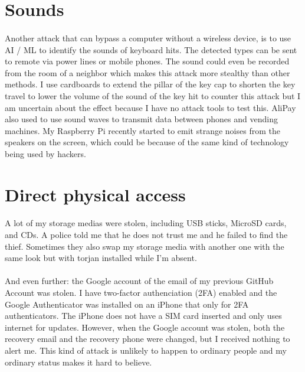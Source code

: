 \documentclass[mscthesis]{usiinfthesis}
\begin{document}
\section{Sounds}
\paragraph{}
Another attack that can bypass a computer without a wireless device, is to use AI / ML to identify the sounds of keyboard hits. The detected types can be sent to remote via power lines or mobile phones. The sound could even be recorded from the room of a neighbor which makes this attack more stealthy than other methods. I use cardboards to extend the pillar of the key cap to shorten the key travel to lower the volume of the sound of the key hit to counter this attack but I am uncertain about the effect because I have no attack tools to test this. AliPay also used to use sound waves to transmit data between phones and vending machines. My Raspberry Pi recently started to emit strange noises from the speakers on the screen, which could be because of the same kind of technology being used by hackers.

\section{Direct physical access}
\paragraph{}
A lot of my storage medias were stolen, including USB sticks, MicroSD cards, and CDs. A police told me that he does not trust me and he failed to find the thief. Sometimes they also swap my storage media with another one with the same look but with torjan installed while I'm absent.
\paragraph{}
And even further: the Google account of the email of my previous GitHub Account was stolen. I have two-factor authenciation (2FA) enabled and the Google Authenticator was installed on an iPhone that only for 2FA authenticators. The iPhone does not have a SIM card inserted and only uses internet for updates. However, when the Google account was stolen, both the recovery email and the recovery phone were changed, but I received nothing to alert me. This kind of attack is unlikely to happen to ordinary people and my ordinary status makes it hard to believe.
\end{document}
